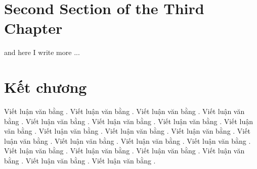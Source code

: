 \section{Second Section of the Third Chapter}
and here I write more ...


\section{Kết chương}
Viết luận văn bằng  . Viết luận văn bằng  . Viết luận văn bằng  . Viết luận văn bằng  . Viết luận văn bằng  . Viết luận văn bằng  . Viết luận văn bằng  . Viết luận văn bằng  . Viết luận văn bằng  . Viết luận văn bằng  . Viết luận văn bằng  . Viết luận văn bằng  . Viết luận văn bằng  . Viết luận văn bằng  . Viết luận văn bằng  . Viết luận văn bằng  . Viết luận văn bằng  . Viết luận văn bằng  . Viết luận văn bằng  . Viết luận văn bằng  . Viết luận văn bằng  .  

